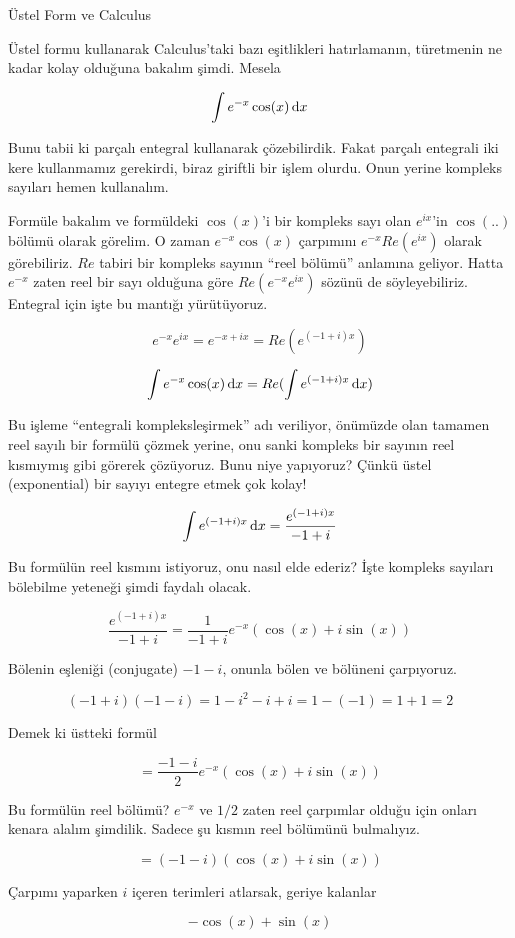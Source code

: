 \documentclass[12pt,fleqn]{article}\usepackage{../../common}
\begin{document}
Üstel Form ve Calculus

Üstel formu kullanarak Calculus'taki bazı eşitlikleri hatırlamanın,
türetmenin ne kadar kolay olduğuna bakalım şimdi. Mesela

$$ \int e^{-x}\cos(x) \,\mathrm{d} x $$

Bunu tabii ki parçalı entegral kullanarak çözebilirdik. Fakat parçalı
entegrali iki kere kullanmamız gerekirdi, biraz giriftli bir işlem
olurdu. Onun yerine kompleks sayıları hemen kullanalım. 

Formüle bakalım ve formüldeki $\cos(x)$'i bir kompleks sayı olan $e^{ix}$'in
$\cos(..)$ bölümü olarak görelim. O zaman $e^{-x}\cos(x)$ çarpımını
$e^{-x}Re(e^{ix}) $ olarak görebiliriz. $Re$ tabiri bir kompleks sayının
``reel bölümü'' anlamına geliyor. Hatta $e^{-x}$ zaten reel bir sayı
olduğuna göre $Re(e^{-x}e^{ix})$ sözünü de söyleyebiliriz. Entegral için
işte bu mantığı yürütüyoruz.

$$ e^{-x}e^{ix} = e^{-x + ix} = Re(e^{(-1+i)x}) $$

$$ \int e^{-x}\cos(x) \,\mathrm{d} x = Re (\int e^{(-1+i)x} \,\mathrm{d} x) $$

Bu işleme ``entegrali kompleksleşirmek'' adı veriliyor, önümüzde olan
tamamen reel sayılı bir formülü çözmek yerine, onu sanki kompleks bir
sayının reel kısmıymış gibi görerek çözüyoruz. Bunu niye yapıyoruz? Çünkü
üstel (exponential) bir sayıyı entegre etmek çok kolay!

$$ \int e^{(-1+i)x} \,\mathrm{d} x = \frac{e^{(-1+i)x}}{-1+i}$$

Bu formülün reel kısmını istiyoruz, onu nasıl elde ederiz? İşte kompleks
sayıları bölebilme yeteneği şimdi faydalı olacak.

$$  \frac{e^{(-1+i)x}}{-1+i} = \frac{1}{-1+i} e^{-x}(\cos(x) + i\sin(x))$$

Bölenin eşleniği (conjugate) $-1-i$, onunla bölen ve bölüneni
çarpıyoruz.

$$ (-1+i)(-1-i) = 1-i^2-i+i = 1-(-1) = 1+1 = 2$$

Demek ki üstteki formül

$$ = \frac{-1-i}{2} e^{-x}(\cos(x) + i\sin(x)) $$

Bu formülün reel bölümü? $e^{-x}$ ve $1/2$ zaten reel çarpımlar olduğu için
onları kenara alalım şimdilik. Sadece şu kısmın reel bölümünü bulmalıyız.

$$ = (-1-i)(\cos(x) + i\sin(x)) $$

Çarpımı yaparken $i$ içeren terimleri atlarsak, geriye kalanlar

$$ -\cos(x) + \sin(x) $$
\end{document}
